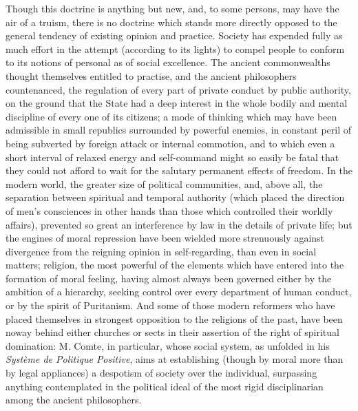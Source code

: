 \documentclass[11pt,openany]{book}
\begin{document}
Though this doctrine is anything but new, and, to some persons, may have the air of a truism, there is no doctrine which stands more directly opposed to the general tendency of existing opinion and practice. Society has expended fully as much effort in the attempt (according to its lights) to compel people to conform to its notions of personal as of social excellence. The ancient commonwealths thought themselves entitled to practise, and the ancient philosophers countenanced, the regulation of every part of private conduct by public authority, on the ground that the State had a deep interest in the whole bodily and mental discipline of every one of its citizens; a mode of thinking which may have been admissible in small republics surrounded by powerful enemies, in constant peril of being subverted by foreign attack or internal commotion, and to which even a short interval of relaxed energy and self-command might so easily be fatal that they could not afford to wait for the salutary permanent effects of freedom. In the modern world, the greater size of political communities, and, above all, the separation between spiritual and temporal authority (which placed the direction of men's consciences in other hands than those which controlled their worldly affairs), prevented so great an interference by law in the details of private life; but the engines of moral repression have been wielded more strenuously against divergence from the reigning opinion in self-regarding, than even in social matters; religion, the most powerful of the elements which have entered into the formation of moral feeling, having almost always been governed either by the ambition of a hierarchy, seeking control over every department of human conduct, or by the spirit of Puritanism. And some of those modern reformers who have placed themselves in strongest opposition to the religions of the past, have been noway behind either churches or sects in their assertion of the right of spiritual domination: M. Comte, in particular, whose social system, as unfolded in his \emph{Système de Politique Positive}, aims at establishing (though by moral more than by legal appliances) a despotism of society over the individual, surpassing anything contemplated in the political ideal of the most rigid disciplinarian among the ancient philosophers.
\end{document}

